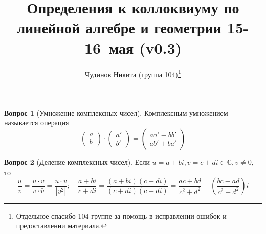 \documentclass[a4paper,11pt]{article}
\theoremstyle{remark}
\theoremstyle{definition}
\newtheorem{question}{Вопрос}
\begin{document}
\author{Чудинов Никита (группа 104)\thanks{Отдельное спасибо 104 группе за помощь в исправлении ошибок и предоставлении материала.}}
\date{}
\title{\vspace{-2.0cm}Определения к коллоквиуму по линейной алгебре и геометрии 15-16~мая {\Large(v0.3)}}
\frenchspacing


\maketitle


\begin{question}[Умножение комплексных чисел]
Комплексным умножением называется операция
\begin{equation*}
	\begin{pmatrix}
		a \\
		b
	\end{pmatrix}
	\cdot
	\begin{pmatrix}
		a' \\
		b'
	\end{pmatrix}
	=
	\begin{pmatrix}
		aa' - bb' \\
		ab' + ba'
	\end{pmatrix}
\end{equation*}
\end{question}


\begin{question}[Деление комплексных чисел]
Если \(u = a + bi, v = c + di \in \mathbb{C}, v \neq 0\), то
\begin{equation*}
	\frac{u}{v} =
	\frac{u \cdot \bar{v}}{v \cdot \bar{v}} =
	\frac{u \cdot \bar{v}}{|v^2|}; \quad
	\frac{a + bi}{c + di} = 
	\frac{(a + bi)(c - di)}{(c + di)(c - di)} =
	\frac{ac + bd}{c^2 + d^2} + \left(\frac{bc - ad}{c^2 + d^2}\right)i
\end{equation*}
\end{question}
\end{document}
